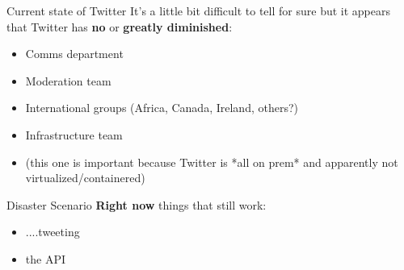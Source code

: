 \documentclass{beamer}
\begin{document}
\begin{frame}{Current state of Twitter}
	It's a little bit difficult to tell for sure but it appears that Twitter has \textbf{no} or \textbf{greatly diminished}:
	\begin{itemize}
		\pause
		\item Comms department
		\pause
		\item Moderation team
		\pause
		\item International groups (Africa, Canada, Ireland, others?)
		\pause 
		\item Infrastructure team 
		\pause
		\item (this one is important because Twitter is *all on prem* and apparently not virtualized/containered)
	\end{itemize}
\end{frame}

\begin{frame}{Disaster Scenario}
	\textbf{Right now} things that still work:
	\begin{itemize}
		\pause
		\item ....tweeting
		\pause
		\item the API
		\pause
	\end{itemize}
\end{frame}
\end{document}
